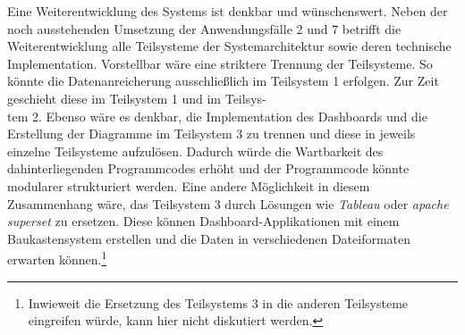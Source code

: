 

Eine Weiterentwicklung des Systems ist denkbar und wünschenswert. 
Neben der noch ausstehenden Umsetzung der Anwendungsfälle 2 und 7 betrifft die Weiterentwicklung alle Teilsysteme der Systemarchitektur
sowie deren technische Implementation. Vorstellbar wäre eine striktere Trennung der Teilsysteme. 
So könnte die Datenanreicherung ausschließlich im Teilsystem 1 erfolgen. Zur Zeit geschieht diese im Teilsystem 1 und im Teilsys-\\tem 2. 
Ebenso wäre es denkbar, die Implementation des Dashboards und die Erstellung der Diagramme im Teilsystem 3 zu trennen und diese in jeweils einzelne Teilsysteme
aufzulösen. Dadurch würde die Wartbarkeit des dahinterliegenden Programmcodes erhöht und der Programmcode könnte modularer strukturiert werden.
Eine andere Möglichkeit in diesem Zusammenhang wäre, das Teilsystem 3 durch Lösungen wie \textit{Tableau} oder \textit{apache superset} zu ersetzen.
Diese können Dashboard-Applikationen mit einem Baukastensystem erstellen und die Daten in verschiedenen Dateiformaten erwarten können.\footnote{Inwieweit die Ersetzung des Teilsystems 3 in die anderen Teilsysteme eingreifen würde, kann
hier nicht diskutiert werden.}


